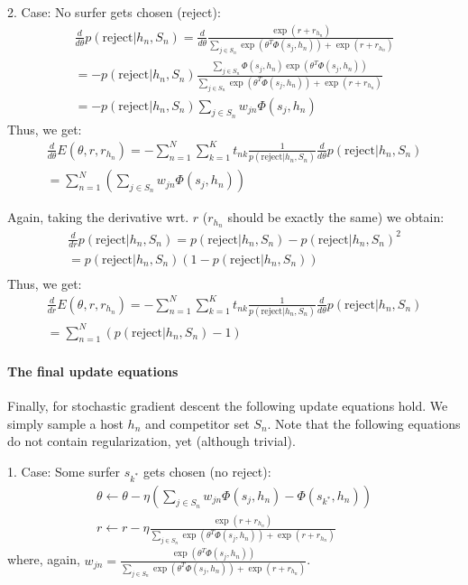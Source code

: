\documentclass[10pt]{article}
\begin{document}
2. Case: No surfer gets chosen (reject):
\begin{eqnarray}
\frac{d}{d \theta} p(\text{reject} | h_n, S_n) = \frac{d}{d \theta} \frac{\exp(r+r_{h_n})}{\sum_{j \in S_n} \exp(\theta^T \Phi(s_j,h_n)) + \exp(r + r_{h_n})}\\
= - p(\text{reject} | h_n, S_n) \frac{\sum_{j \in S_n} \Phi(s_j,h_n) \exp(\theta^T \Phi(s_j,h_n))}{\sum_{j \in S_n} \exp(\theta^T \Phi(s_j,h_n)) + \exp(r + r_{h_n})} \\
= - p(\text{reject} | h_n, S_n) \sum_{j \in S_n} w_{jn} \Phi(s_j,h_n)
\end{eqnarray}
Thus, we get:
\begin{eqnarray}
\frac{d}{d \theta} E(\theta, r, r_{h_n}) = - \sum_{n=1}^N \sum_{k=1}^K t_{nk} \frac{1}{p(\text{reject} | h_n, S_n)} \frac{d}{d \theta} p(\text{reject} | h_n, S_n)\\
= \sum_{n=1}^N (\sum_{j \in S_n} w_{jn} \Phi(s_j,h_n))
\end{eqnarray}



Again, taking the derivative wrt. $r$ ($r_{h_n}$ should be exactly the same) we obtain:
\begin{eqnarray}
\frac{d}{d r} p(\text{reject} | h_n, S_n) = p(\text{reject} | h_n, S_n) - p(\text{reject} | h_n, S_n)^2\\
= p(\text{reject} | h_n, S_n) (1 - p(\text{reject} | h_n, S_n))\\
\end{eqnarray}
Thus, we get:
\begin{eqnarray}
\frac{d}{d r} E(\theta, r, r_{h_n}) = - \sum_{n=1}^N \sum_{k=1}^K t_{nk} \frac{1}{p(\text{reject} | h_n, S_n)} \frac{d}{d \theta} p(\text{reject} | h_n, S_n)\\
= \sum_{n=1}^N (p(\text{reject} | h_n, S_n)-1)
\end{eqnarray}


\paragraph{The final update equations}

Finally, for stochastic gradient descent the following update equations hold. We simply sample a host $h_n$ and competitor set $S_n$. Note that the following equations do not contain regularization, yet (although trivial).

1. Case: Some surfer $s_{k^*}$ gets chosen (no reject):
\begin{eqnarray}
\theta \leftarrow \theta - \eta (\sum_{j \in S_n} w_{jn} \Phi(s_j,h_n) - \Phi(s_{k^*},h_n))\\
r \leftarrow r - \eta \frac{\exp(r + r_{h_n})}{\sum_{j \in S_n} \exp(\theta^T \Phi(s_j,h_n)) + \exp(r + r_{h_n})}
\end{eqnarray}
where, again, $w_{jn}=\frac{\exp(\theta^T \Phi(s_j,h_n))}{\sum_{j \in S_n} \exp(\theta^T \Phi(s_j,h_n)) + \exp(r + r_{h_n})}$.
\end{document}
